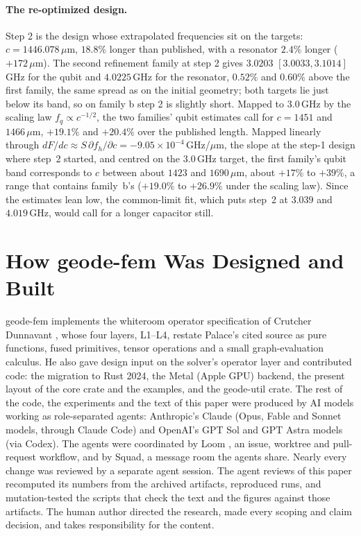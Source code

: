\documentclass{anvil-paper}
\begin{document}
\paragraph{The re-optimized design.}
Step 2 is the design whose extrapolated frequencies sit on the targets:
$c = 1446.078\,\mu$m, $18.8\%$ longer than published, with a resonator
$2.4\%$ longer ($+172\,\mu$m). The second refinement family at step 2 gives
$3.0203$ $[3.0033, 3.1014]$\,GHz for the qubit and $4.0225$\,GHz for the
resonator, $0.52\%$ and $0.60\%$ above the first family, the same spread as
on the initial geometry; both targets lie just below its band, so on family
b step 2 is slightly short. Mapped to $3.0$\,GHz by the scaling law $f_q
\propto c^{-1/2}$, the two families' qubit estimates call for $c = 1451$ and
$1466\,\mu$m, $+19.1\%$ and $+20.4\%$ over the published length. Mapped
linearly through $dF/dc \approx
S\,\partial f_h/\partial c = -9.05\times10^{-4}$\,GHz/$\mu$m, the slope at
the step-1 design where step~2 started, and centred on the $3.0$\,GHz
target, the first family's qubit band corresponds to $c$ between about
$1423$ and $1690\,\mu$m, about $+17\%$ to $+39\%$, a range that contains
family~b's ($+19.0\%$ to $+26.9\%$ under the scaling law). Since the estimates lean low, the common-limit
fit, which puts step~2 at $3.039$ and $4.019$\,GHz, would call for a longer
capacitor still.


\section{How geode-fem Was Designed and Built}
\label{sec:built}

geode-fem implements the whiteroom operator specification of Crutcher
Dunnavant \citep{dunnavant2026whiteroom}, whose four layers, L1--L4,
restate Palace's cited source as pure functions, fused primitives, tensor
operations and a small graph-evaluation calculus. He also gave design
input on the solver's operator layer and contributed code: the migration to
Rust 2024, the Metal (Apple GPU) backend, the present layout of the core
crate and the examples, and the geode-util crate. The rest of the code, the
experiments and the text of this paper were produced by AI models
working as role-separated agents: Anthropic's Claude (Opus, Fable and
Sonnet models, through Claude Code) and OpenAI's GPT Sol and GPT Astra
models (via Codex). The agents were coordinated by Loom \citep{loom}, an
issue, worktree and pull-request workflow, and by Squad, a message room
the agents share.
Nearly every change was reviewed by a separate agent session. The agent
reviews of this paper recomputed its numbers from the archived artifacts,
reproduced runs, and mutation-tested the scripts that check the text and
the figures against those artifacts. The human author directed the
research, made every scoping and claim decision, and takes responsibility
for the content.
\end{document}
